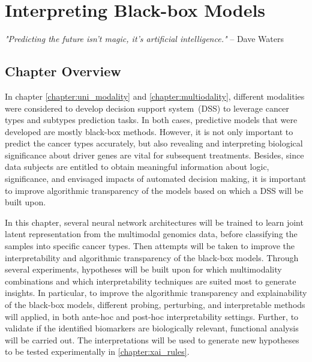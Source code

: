 \chapter{Interpreting Black-box Models}\label{chapter:xai}

\textit{"Predicting the future isn't magic, it's artificial intelligence."} -- Dave Waters 

\section{Chapter Overview}
In chapter \ref{chapter:uni_modality} and \ref{chapter:multiodality}, different modalities were considered to develop decision support system~(DSS) to leverage cancer types and subtypes prediction tasks. In both cases, predictive models that were developed are mostly black-box methods. However, it is not only important to predict the cancer types accurately, but also revealing and interpreting biological significance about driver genes are vital for subsequent treatments. Besides, since data subjects are entitled to obtain meaningful information about logic, significance, and envisaged impacts of automated decision making, it is important to improve algorithmic transparency of the models based on which a DSS will be built upon. 

\hspace*{3.5mm} In this chapter, several neural network architectures will be trained to learn joint latent representation from the multimodal genomics data, before classifying the samples into specific cancer types. Then attempts will be taken to improve the interpretability and algorithmic transparency of the black-box models. Through several experiments, hypotheses will be built upon for which multimodality combinations and which interpretability techniques are suited most to generate insights. In particular, to improve the algorithmic transparency and explainability of the black-box models, different probing, perturbing, and interpretable methods will applied, in both ante-hoc and post-hoc interpretability settings. Further, to validate if the identified biomarkers are biologically relevant, functional analysis will be carried out. The interpretations will be used to generate new hypotheses to be tested experimentally in \cref{chapter:xai_rules}. %

